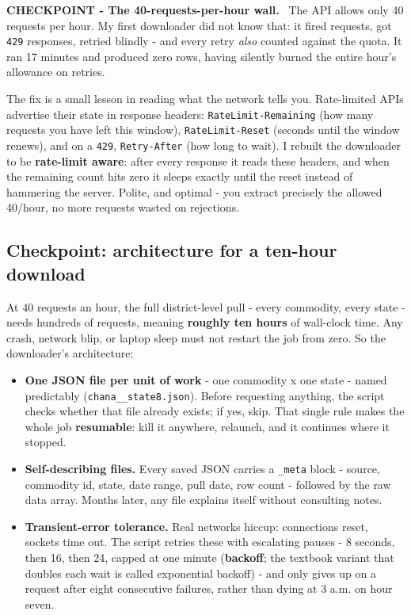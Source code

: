 \documentclass[11pt]{article}
\newenvironment{checkpoint}[1]
  {\begin{framed}\noindent\textbf{CHECKPOINT - #1.}\ }
  {\end{framed}}
\begin{document}
\begin{checkpoint}{The 40-requests-per-hour wall}
The API allows only 40 requests per hour. My first downloader did not know that: it fired
requests, got \texttt{429} responses, retried blindly - and every retry \emph{also} counted
against the quota. It ran 17 minutes and produced zero rows, having silently burned the
entire hour's allowance on retries.
\end{checkpoint}

The fix is a small lesson in reading what the network tells you. Rate-limited APIs
advertise their state in response headers: \texttt{RateLimit-Remaining} (how many requests
you have left this window), \texttt{RateLimit-Reset} (seconds until the window renews), and
on a \texttt{429}, \texttt{Retry-After} (how long to wait). I rebuilt the downloader to be
\textbf{rate-limit aware}: after every response it reads these headers, and when the
remaining count hits zero it sleeps exactly until the reset instead of hammering the
server. Polite, and optimal - you extract precisely the allowed 40/hour, no more requests
wasted on rejections.

\subsection{Checkpoint: architecture for a ten-hour download}

At 40 requests an hour, the full district-level pull - every commodity, every state -
needs hundreds of requests, meaning \textbf{roughly ten hours} of wall-clock time. Any
crash, network blip, or laptop sleep must not restart the job from zero. So the
downloader's architecture:

\begin{itemize}[leftmargin=1.8em,itemsep=1pt]
  \item \textbf{One JSON file per unit of work} - one commodity x one state - named
        predictably (\texttt{chana\_\_state8.json}). Before requesting anything, the
        script checks whether that file already exists; if yes, skip. That single rule
        makes the whole job \textbf{resumable}: kill it anywhere, relaunch, and it
        continues where it stopped.
  \item \textbf{Self-describing files.} Every saved JSON carries a \texttt{\_meta} block -
        source, commodity id, state, date range, pull date, row count - followed by the
        raw data array. Months later, any file explains itself without consulting notes.
  \item \textbf{Transient-error tolerance.} Real networks hiccup: connections reset,
        sockets time out. The script retries these with escalating pauses - 8 seconds,
        then 16, then 24, capped at one minute (\textbf{backoff}; the textbook variant
        that doubles each wait is called exponential backoff) - and only gives up on a
        request after eight consecutive failures, rather than dying at 3 a.m. on hour
        seven.
\end{itemize}
\end{document}
